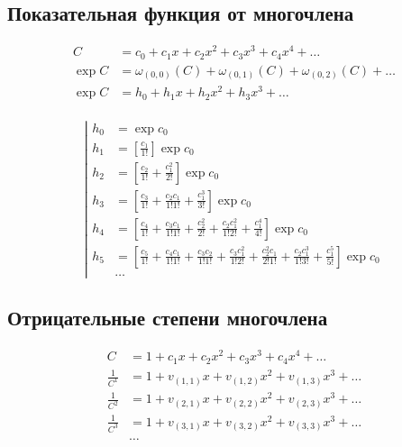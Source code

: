 \subsection{Показательная функция от многочлена}

\begin{equation*}
\begin{aligned}
C &= c_0 + c_1 x + c_2 x^2 + c_3 x^3 + c_4 x^4 + \ldots \\
\exp{C} &= \omega_{(0,0)}(C) + \omega_{(0,1)}(C) + \omega_{(0,2)}(C) + \ldots \\
\exp{C} &= h_0 + h_1 x + h_2 x^2 + h_3 x^3 + \ldots \\
\end{aligned}
\end{equation*}

\begin{equation*}
\left|
\begin{aligned}
h_0 &= \exp{c_0}
\\
h_1 
&= \left[\frac{c_1}{1!} \right] \exp{c_0}
\\ 
h_2 
&= \left[\frac{c_2}{1!} 
+ \frac{c_1^2}{2!} \right] \exp{c_0}
\\
h_3 
&= \left[\frac{c_3}{1!} 
+ \frac{c_2 c_1}{1!1!} 
+ \frac{c_1^3}{3!} \right] \exp{c_0}
\\
h_4 
&= \left[\frac{c_4}{1!} 
+ \frac{c_3 c_1}{1!1!} 
+ \frac{c_2^2}{2!} 
+ \frac{c_2 c_1^2}{1!2!} 
+ \frac{c_1^4}{4!} \right] \exp{c_0}
\\
h_5
&= \left[\frac{c_5}{1!}
+ \frac{c_4 c_1}{1!1!}
+ \frac{c_3 c_2}{1!1!}
+ \frac{c_3 c_1^2}{1!2!}
+ \frac{c_2^2 c_1}{2!1!}
+ \frac{c_2 c_1^3}{1!3!}
+ \frac{c_1^5}{5!} \right] \exp{c_0}
\\
&\ldots
\end{aligned}
\right.
\end{equation*}

\subsection{Отрицательные степени многочлена}

\begin{equation*}
\begin{aligned}
C &= 1 + c_1 x + c_2 x^2 + c_3 x^3 + c_4 x^4 + \ldots \\
\frac{1}{C^1} &= 1 + v_{(1,1)} x + v_{(1,2)} x^2 + v_{(1,3)} x^3 + \ldots 	\\ 
\frac{1}{C^2} &= 1 + v_{(2,1)} x + v_{(2,2)} x^2 + v_{(2,3)} x^3 + \ldots 	\\
\frac{1}{C^3} &= 1 + v_{(3,1)} x + v_{(3,2)} x^2 + v_{(3,3)} x^3 + \ldots 	\\ 
&\dots
\end{aligned}
\end{equation*}

